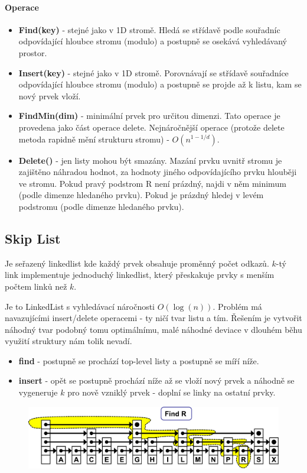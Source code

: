 \paragraph{Operace}
\begin{itemize}
\item \textbf{Find(key)} - stejné jako v 1D stromě. Hledá se střídavě podle souřadníc odpovídající hloubce stromu (modulo) a postupně se osekává vyhledávaný prostor.

\item \textbf{Insert(key)} - stejné jako v 1D stromě. Porovnávají se střídavě souřadníce odpovídající hloubce stromu (modulo) a postupně se projde až k listu, kam se nový prvek vloží.

\item \textbf{FindMin(dim)} - minimální prvek pro určitou dimenzi. Tato operace je provedena jako část operace delete. Nejnáročnější operace (protože delete metoda rapidně mění strukturu stromu) - $O(n^{1-1/d})$.

\item \textbf{Delete()} - jen listy mohou být smazány. Mazání prvku uvnitř stromu je zajištěno náhradou hodnot, za hodnoty jiného odpovídajícího prvku hlouběji ve stromu. Pokud pravý podstrom R není prázdný, najdi v něm minimum (podle dimenze hledaného prvku). Pokud je prázdný hledej v levém podstromu (podle dimenze hledaného prvku).
\end{itemize}

\subsection{Skip List}
Je seřazený linkedlist kde každý prvek obsahuje proměnný počet odkazů. $k$-tý link implementuje jednoduchý linkedlist, který přeskakuje prvky s menším počtem linků než $k$.

Je to LinkedList s vyhledávací náročnosti $O(\log(n))$. Problém má navazujícími insert/delete operacemi - ty ničí  tvar listu a tím. Řešením je vytvořit náhodný tvar podobný tomu optimálnímu, malé náhodné deviace v dlouhém běhu využití struktury nám tolik nevadí.

\begin{itemize}
\item \textbf{find} - postupně se prochází top-level listy a postupně se míří níže.
\item \textbf{insert} - opět se postupně prochází níže až se vloží nový prvek a náhodně se vygeneruje $k$ pro nově vzniklý prvek - doplní se linky na ostatní prvky.
\end{itemize}

\begin{figure}[h]
    \begin{center}
        \includegraphics[width=130mm]{03/images/skiplist}
    \end{center}
\end{figure}